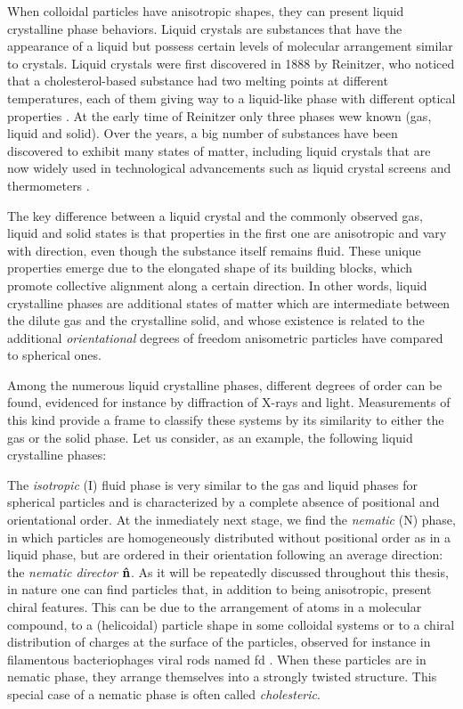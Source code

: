 When colloidal particles have anisotropic shapes, they can present liquid crystalline phase behaviors. Liquid crystals are substances that have the appearance of a liquid but possess certain levels of molecular arrangement similar to crystals. Liquid crystals were first discovered in 1888 by Reinitzer, who noticed that a cholesterol-based substance had two melting points at different temperatures, each of them giving way to a liquid-like phase with different optical properties \cite{reinitzer1888beitrage}. At the early time of Reinitzer only three phases wew known (gas, liquid and solid). Over the years, a big number of substances have been discovered to exhibit many states of matter, including liquid crystals that are now widely used in technological advancements such as liquid crystal screens and thermometers \cite{Li_2012}.

The key difference between a liquid crystal and the commonly observed gas, liquid and solid states is that properties in the first one are anisotropic and vary with direction, even though the substance itself remains fluid. These unique properties emerge due to the elongated shape of its building blocks, which promote collective alignment along a certain direction. In other words, liquid crystalline phases are additional states of matter which are intermediate between the dilute gas and the crystalline solid, and whose existence is related to the additional {\em orientational} degrees of freedom anisometric particles have compared to spherical ones.

Among the numerous liquid crystalline phases, different degrees of order can be found, evidenced for instance by diffraction of X-rays and light. Measurements of this kind provide a frame to classify these systems by its similarity to either the gas or the solid phase. Let us consider, as an example, the following liquid crystalline phases:

The {\em isotropic} (I) fluid phase is very similar to the gas and liquid phases for spherical particles and is characterized by a complete absence of positional and orientational order. At the inmediately next stage, we find the {\em nematic} (N) phase, in which particles are homogeneously distributed without positional order as in a liquid phase, but are ordered in their orientation following an average direction: the {\em nematic director} ${\bf \hat{n}}$. As it will be repeatedly discussed throughout this thesis, in nature one can find particles that, in addition to being anisotropic, present chiral features. This can be due to the arrangement of atoms in a molecular compound, to a (helicoidal) particle shape in some colloidal systems or to a chiral distribution of charges at the surface of the particles, observed for instance in filamentous bacteriophages viral rods named fd \cite{Gibaud_2017}. When these particles are in nematic phase, they arrange themselves into a strongly twisted structure. This special case of a nematic phase is often called {\em cholesteric}.

